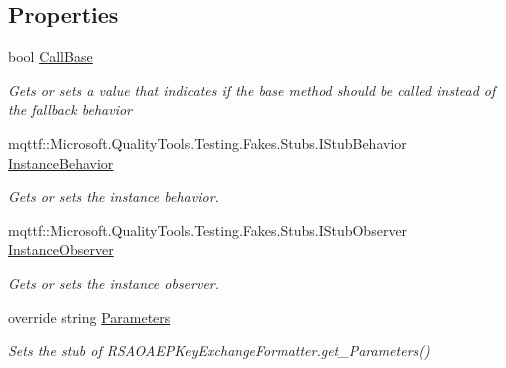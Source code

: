 \subsection*{Properties}
\begin{DoxyCompactItemize}
\item 
bool \hyperlink{class_system_1_1_security_1_1_cryptography_1_1_fakes_1_1_stub_r_s_a_o_a_e_p_key_exchange_formatter_a955a2a3725ae7d3e18a77f0bd8e8d8b2}{Call\-Base}
\begin{DoxyCompactList}\small\item\em Gets or sets a value that indicates if the base method should be called instead of the fallback behavior\end{DoxyCompactList}\item 
mqttf\-::\-Microsoft.\-Quality\-Tools.\-Testing.\-Fakes.\-Stubs.\-I\-Stub\-Behavior \hyperlink{class_system_1_1_security_1_1_cryptography_1_1_fakes_1_1_stub_r_s_a_o_a_e_p_key_exchange_formatter_af13cf04712bb2fcaa1d2a27a106106af}{Instance\-Behavior}
\begin{DoxyCompactList}\small\item\em Gets or sets the instance behavior.\end{DoxyCompactList}\item 
mqttf\-::\-Microsoft.\-Quality\-Tools.\-Testing.\-Fakes.\-Stubs.\-I\-Stub\-Observer \hyperlink{class_system_1_1_security_1_1_cryptography_1_1_fakes_1_1_stub_r_s_a_o_a_e_p_key_exchange_formatter_aee00c49e4246b52669e1e9bc94a8545b}{Instance\-Observer}
\begin{DoxyCompactList}\small\item\em Gets or sets the instance observer.\end{DoxyCompactList}\item 
override string \hyperlink{class_system_1_1_security_1_1_cryptography_1_1_fakes_1_1_stub_r_s_a_o_a_e_p_key_exchange_formatter_a407653b22b5d5fc9bfeef8fa41516d92}{Parameters}
\begin{DoxyCompactList}\small\item\em Sets the stub of R\-S\-A\-O\-A\-E\-P\-Key\-Exchange\-Formatter.\-get\-\_\-\-Parameters()\end{DoxyCompactList}\end{DoxyCompactItemize}


